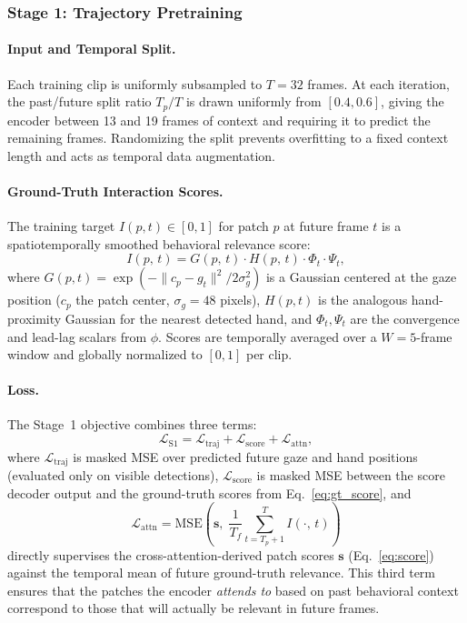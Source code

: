 \subsubsection{Stage 1: Trajectory Pretraining}
\label{sec:stage1}

\paragraph{Input and Temporal Split.}
Each training clip is uniformly subsampled to $T{=}32$ frames.
At each iteration, the past/future split ratio $T_p/T$ is drawn uniformly from $[0.4, 0.6]$,
giving the encoder between 13 and 19 frames of context and requiring it to
predict the remaining frames.
Randomizing the split prevents overfitting to a fixed context length and acts
as temporal data augmentation.

\paragraph{Ground-Truth Interaction Scores.}
The training target $I(p, t) \in [0,1]$ for patch $p$ at future frame $t$
is a spatiotemporally smoothed behavioral relevance score:
\begin{equation}
    I(p,\,t) = G(p,\,t)\cdot H(p,\,t)\cdot\Phi_t\cdot\Psi_t,
    \label{eq:gt_score}
\end{equation}
where $G(p,t) {=} \exp(-\|c_p - g_t\|^2 / 2\sigma_g^2)$ is a Gaussian centered at the
gaze position ($c_p$ the patch center, $\sigma_g{=}48$ pixels),
$H(p,t)$ is the analogous hand-proximity Gaussian for the nearest detected hand,
and $\Phi_t, \Psi_t$ are the convergence and lead-lag scalars from $\phi$.
Scores are temporally averaged over a $W{=}5$-frame window and
globally normalized to $[0,1]$ per clip.

\paragraph{Loss.}
The Stage~1 objective combines three terms:
\begin{equation}
    \mathcal{L}_{\mathrm{S1}} =
        \mathcal{L}_{\mathrm{traj}}
        + \mathcal{L}_{\mathrm{score}}
        + \mathcal{L}_{\mathrm{attn}},
    \label{eq:loss_s1}
\end{equation}
where $\mathcal{L}_{\mathrm{traj}}$ is masked MSE over predicted future gaze and hand
positions (evaluated only on visible detections),
$\mathcal{L}_{\mathrm{score}}$ is masked MSE between the score decoder output and
the ground-truth scores from Eq.~\eqref{eq:gt_score}, and
\begin{equation}
    \mathcal{L}_{\mathrm{attn}} = \mathrm{MSE}\!\left(
        \mathbf{s},\;
        \frac{1}{T_f}\sum_{t=T_p+1}^{T} I(\cdot,\, t)
    \right)
    \label{eq:loss_attn}
\end{equation}
directly supervises the cross-attention-derived patch scores $\mathbf{s}$
(Eq.~\eqref{eq:score}) against the temporal mean of future ground-truth relevance.
This third term ensures that the patches the encoder \emph{attends to}
based on past behavioral context correspond to those that will actually be relevant
in future frames.

